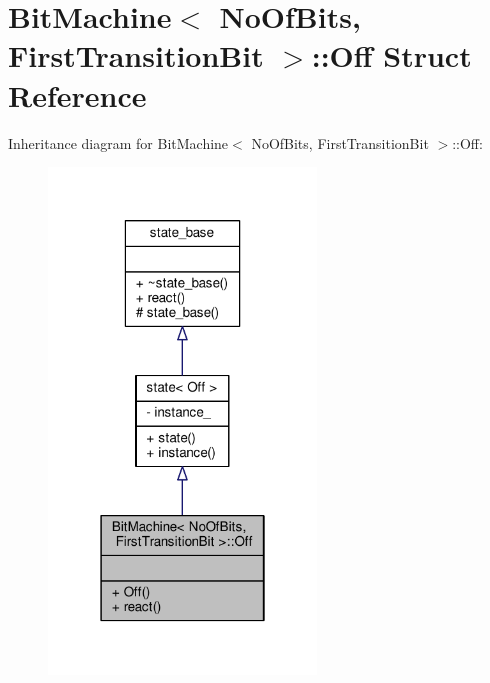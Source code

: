 \hypertarget{struct_bit_machine_1_1_off}{}\section{Bit\+Machine$<$ No\+Of\+Bits, First\+Transition\+Bit $>$\+:\+:Off Struct Reference}
\label{struct_bit_machine_1_1_off}


Inheritance diagram for Bit\+Machine$<$ No\+Of\+Bits, First\+Transition\+Bit $>$\+:\+:Off\+:
\nopagebreak
\begin{figure}[H]
\begin{center}
\leavevmode
\includegraphics[width=202pt]{struct_bit_machine_1_1_off__inherit__graph}
\end{center}
\end{figure}


